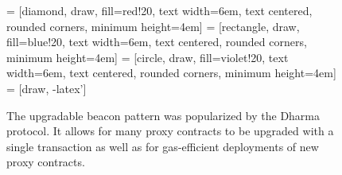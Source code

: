 \begin{figure}[ht] 
    \centering
     = [diamond, draw, fill=red!20, 
    text width=6em, text centered, rounded corners, minimum height=4em] 
     = [rectangle, draw, fill=blue!20, 
    text width=6em, text centered, rounded corners, minimum height=4em]
     = [circle, draw, fill=violet!20, 
        text width=6em, text centered, rounded corners, minimum height=4em]
     = [draw, -latex']
    
    \caption{The upgradable beacon pattern was popularized by the Dharma protocol. It allows for many proxy contracts to be upgraded with a single
    transaction as well as for gas-efficient deployments of new proxy contracts.}
    \label{fig:UpgradePattern}
\end{figure}